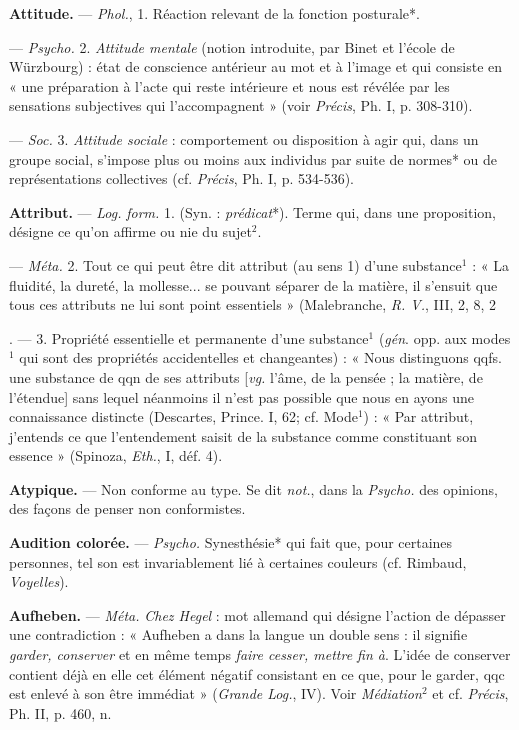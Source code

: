 \begin{itemize}[leftmargin=1cm, label=, itemsep=1pt]
{{\item {\bf Attitude.} — \textsf{\textit {Phol.}}, 1. Réaction relevant de la fonction posturale*.

— \textsf{\textit {Psycho.}} 2. {\it Attitude mentale}
(notion introduite, par Binet et
l’école de Würzbourg) : état de conscience antérieur au mot et à l’image
et qui consiste en « une préparation
à l'acte qui reste intérieure et nous
est révélée par les sensations subjectives qui l’accompagnent » (voir
{\it Précis}, Ph. I, p. 308-310).

— \textsf{\textit {Soc.}} 3. {\it Attitude sociale} : comportement ou disposition à agir qui,
dans un groupe social, s'impose plus
ou moins aux individus par suite de
normes* ou de représentations collectives (cf. {\it Précis}, Ph. I, p. 534-536).

\item {\bf Attribut.} — \textsf{\textit {Log.}} \textsf{\textit {form.}} 1. (Syn. : {\it prédicat}*). Terme qui, dans
une proposition, désigne ce qu’on affirme
ou nie du sujet$^2$.

— \textsf{\textit {Méta.}} 2. Tout ce qui peut être
dit attribut (au sens 1) d'une substance$^1$ : « La fluidité, la dureté, la
mollesse... se pouvant séparer de la
matière, il s'ensuit que tous ces
attributs ne lui sont point essentiels » (Malebranche, {\it R. V.}, III, 2,
8, 2}. — 3. Propriété essentielle et
permanente d’une substance$^1$ ({\it gén}.
opp. aux modes$^1$ qui sont des propriétés accidentelles et changeantes) :
« Nous distinguons qqfs. une substance de qqn de ses attributs [{\it vg.}
l'âme, de la pensée ; la matière, de
l'étendue] sans lequel néanmoins il
n’est pas possible que nous en ayons
une connaissance distincte (Descartes, Prince. I, 62; cf. Mode$^1$) :
« Par attribut, j'entends ce que
l’entendement saisit de la substance
comme constituant son essence »
(Spinoza, {\it Eth.}, I, déf. 4).

\item {\bf Atypique.} — Non conforme au type.
Se dit {\it not.}, dans la \textsf{\textit {Psycho.}} des opinions, des façons de penser non
conformistes.

\item {\bf Audition colorée.} — \textsf{\textit {Psycho.}} Synesthésie* qui fait que, pour certaines
personnes, tel son est invariablement lié à certaines couleurs (cf.
Rimbaud, {\it Voyelles}).

\item {\bf Aufheben.} — \textsf{\textit {Méta.}} {\it Chez Hegel} : mot
allemand qui désigne l’action de
dépasser une contradiction : « Aufheben a dans la langue un double
sens : il signifie {\it garder, conserver} et
en même temps {\it faire cesser, mettre
fin à}. L'idée de conserver contient
déjà en elle cet élément négatif
consistant en ce que, pour le garder,
qqc est enlevé à son être immédiat »
({\it Grande \textsf{\textit {Log.}}}, IV). Voir {\it Médiation}$^2$
et cf. {\it Précis}, Ph. II, p. 460, n.

}
\end{itemize}
